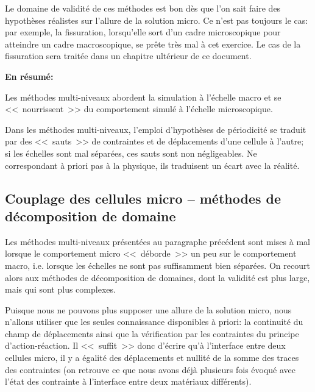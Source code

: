 Le domaine de validité de ces méthodes est bon dès que l'on sait faire des hypothèses
réalistes sur l'allure de la solution micro. Ce n'est pas toujours le cas: par exemple, la fissuration,
lorsqu'elle sort d'un cadre microscopique pour atteindre un cadre macroscopique, se prête
très mal à cet exercice.
Le cas de la fissuration sera traitée dans un chapitre ultérieur de ce document.

\medskip{}
\textbf{En résumé:}

Les méthodes multi-niveaux abordent la simulation à l'échelle macro
et se <<~nourrissent~>>  du comportement simulé à l'échelle microscopique.

Dans les méthodes multi-niveaux, l'emploi d'hypothèses de périodicité se traduit par
des <<~sauts~>> de contraintes et de déplacements d'une cellule à l'autre; si les échelles sont
mal séparées, ces sauts sont non négligeables. Ne correspondant à priori pas à la physique,
ils traduisent un écart avec la réalité.



\medskip
\subsection{Couplage des cellules micro -- méthodes de décomposition de domaine}\label{Sec-dec}

Les méthodes multi-niveaux présentées au paragraphe précédent sont mises à mal
lorsque le comportement micro <<~déborde~>> un peu sur le comportement macro, i.e.
lorsque les échelles ne sont pas suffisamment bien séparées.
On recourt alors aux méthodes de décomposition de domaines,
dont la validité est plus large, mais qui sont plus complexes.

\medskip
Puisque nous ne pouvons plus supposer une allure de la solution micro,
nous n'allons utiliser que les seules connaissance disponibles à priori: la continuité du champ de déplacements
ainsi que la vérification par les contraintes du principe d'action-réaction. Il <<~suffit~>> donc
d'écrire qu'à l'interface entre deux cellules micro, il y a égalité des déplacements et
nullité de la somme des traces des contraintes (on retrouve ce que nous avons déjà
plusieurs fois évoqué avec l'état des contrainte à l'interface entre deux matériaux
différents).

